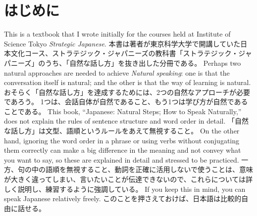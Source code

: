 \documentclass[uplatex,dvipdfmx,b5paper,english,10pt]{jsbook}
\newif\ifPREFACE
\begin{document}
\frontmatter
\thispagestyle{empty}

%


\ifEnglish
\setlength{\parindent}{3em}
\else
\fi

\ifPREFACE
\ifEnglish
\chapter*{Preface}
\else
\chapter*{はじめに}
\fi

\ifEnglish
This is a textbook that I wrote initially for the courses held at Institute of Science Tokyo {\itshape Strategic Japanese\/}.
\else
本書は著者が東京科学大学で開講していた日本文化コース、ストラテジック・ジャパニーズの教科書「ストラテジック・ジャパニーズ」のうち、「自然な話し方」を抜き出した分冊である。
\fi
\ifEnglish
Perhaps two natural approaches are needed to achieve {\it Natural speaking\/}:
one is that the conversation itself is natural; and the other is that the way of learning is natural.
\else
おそらく「自然な話し方」を達成するためには、2つの自然なアプローチが必要であろう。
1つは、会話自体が自然であること、もう1つは学び方が自然であることである。
\fi
\ifEnglish
This book, ``Japanese: Natural Steps; How to Speak Naturally,'' does not explain the rules of sentence structure and word order in detail.
\else
「自然な話し方」は文型、語順というルールをあえて無視すること。
\fi
\ifEnglish
On the other hand, ignoring the word order in a phrase or using verbs without conjugating them correctly can make a big difference in the meaning and not convey what you want to say, so these are explained in detail and stressed to be practiced.
\else
一方、句の中の語順を無視すること、動詞を正確に活用しないで使うことは、意味が大きく違ってしまい、言いたいことが伝達できないので、これらについては詳しく説明し、練習するように強調している。
\fi
\ifEnglish
If you keep this in mind, you can speak Japanese relatively freely.
\else
このことを押さえておけば、日本語は比較的自由に話せる。
\fi
\end{document}
